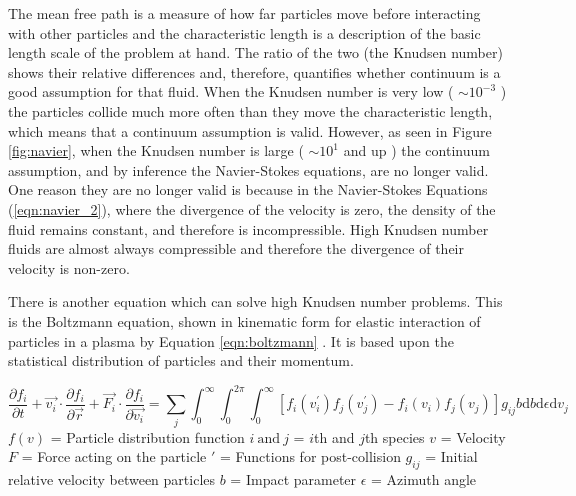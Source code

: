\indent The mean free path is a measure of how far particles move before interacting with other particles and the characteristic length is a description of the basic length scale of the problem at hand. The ratio of the two (the Knudsen number) shows their relative differences and, therefore, quantifies whether continuum is a good assumption for that fluid. When the Knudsen number is very low ( \(\sim10^{-3}\) ) the particles collide much more often than they move the characteristic length, which means that a continuum assumption is valid. However, as seen in Figure \ref{fig:navier}, when the Knudsen number is large ( \(\sim10^{1}\) and up ) the continuum assumption, and by inference the Navier-Stokes equations, are no longer valid. One reason they are no longer valid is because in the Navier-Stokes Equations (\ref{eqn:navier_2}), where the divergence of the velocity is zero, the density of the fluid remains constant, and therefore is incompressible. High Knudsen number fluids are almost always compressible and therefore the divergence of their velocity is non-zero. \par


\indent There is another equation which can solve high Knudsen number problems. This is the Boltzmann equation, shown in kinematic form for elastic interaction of particles in a plasma by Equation \ref{eqn:boltzmann} \cite{boltzmann}. It is based upon the statistical distribution of particles and their momentum. \par


\begin{equation}
    \label{eqn:boltzmann}
    \frac{\partial f_i}{\partial t} + \vec{v_i} \cdot \frac{\partial f_i}{\partial \vec{r}} + \vec{F_i} \cdot \frac{\partial f_i}{\partial \vec{v_i}} = \sum_j \int_0^\infty \int_0^{2\pi} \int_0^\infty  [ f_i(v_i^\prime) f_j (v_j^\prime) - f_i (v_i) f_j (v_j) ] g_{ij} b \text{d} b \text{d} \epsilon \text{d} v_j
\end{equation}
\(f(v)\) = Particle distribution function \newline
\(i \: \text{and} \: j\) =  \(i\)th and \(j\)th species \newline
\(v\) = Velocity  \newline
\(F\) = Force acting on the particle \newline
\(\prime\) = Functions for post-collision \newline
\(g_{ij}\) = Initial relative velocity between particles \newline
\(b\) = Impact parameter \newline
\(\epsilon\) = Azimuth angle \par

